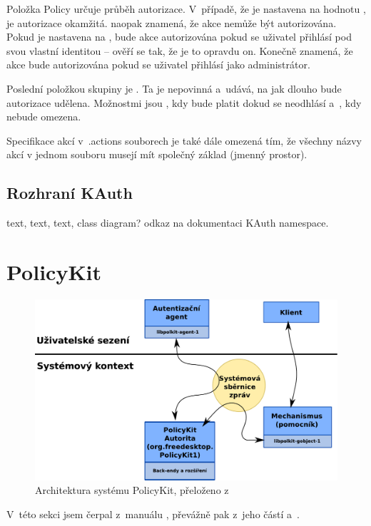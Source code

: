 Položka Policy určuje průběh autorizace. V~případě, že je nastavena na hodnotu , je autorizace okamžitá.  naopak znamená, že akce nemůže být autorizována. Pokud je nastavena na , bude akce autorizována pokud se uživatel přihlásí pod svou vlastní identitou -- ověří se tak, že je to opravdu on. Konečně  znamená, že akce bude autorizována pokud se uživatel přihlásí jako administrátor.

Poslední položkou skupiny je . Ta je nepovinná a~udává, na jak dlouho bude autorizace udělena. Možnostmi jsou , kdy bude platit dokud se neodhlásí a~, kdy nebude omezena.

Specifikace akcí v~.actions souborech je také dále omezená tím, že všechny názvy akcí v jednom souboru musejí mít společný základ (jmenný prostor).

\subsection*{Rozhraní KAuth}
text, text, text, class diagram? odkaz na dokumentaci KAuth namespace.


\section{PolicyKit}
\begin{figure}[h]
    \centering
    \includegraphics[width=12cm]{obrazky/polkit-architecture-vector-cz.pdf}
    \caption{Architektura systému PolicyKit, přeloženo z~\cite{manpolkit1}}
    \label{fig:polkit_arch}
\end{figure}

V~této sekci jsem čerpal z~manuálu \cite{manpolkit_overview}, převážně pak z~jeho částí \cite{manpolkit1} a~\cite{manpklocalauth}.

